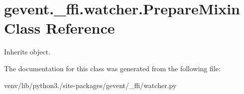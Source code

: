 \hypertarget{classgevent_1_1__ffi_1_1watcher_1_1_prepare_mixin}{}\section{gevent.\+\_\+ffi.\+watcher.\+Prepare\+Mixin Class Reference}
\label{classgevent_1_1__ffi_1_1watcher_1_1_prepare_mixin}


Inherits object.



The documentation for this class was generated from the following file\+:\begin{DoxyCompactItemize}
\item 
venv/lib/python3./site-\/packages/gevent/\+\_\+ffi/watcher.\+py\end{DoxyCompactItemize}
